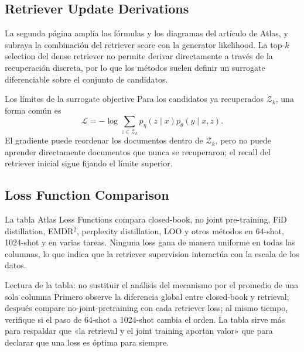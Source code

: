 \subsection{Retriever Update Derivations}

La segunda página amplía las fórmulas y los diagramas del artículo de Atlas, y subraya la combinación del retriever score con la generator likelihood. La top-$k$ selection del dense retriever no permite derivar directamente a través de la recuperación discreta, por lo que los métodos suelen definir un surrogate diferenciable sobre el conjunto de candidatos.


\begin{importantbox}{Los límites de la surrogate objective}
Para los candidatos ya recuperados $\mathcal{Z}_k$, una forma común es
\[
\mathcal{L}=-\log\sum_{z\in\mathcal{Z}_k}
p_\eta(z\mid x)p_\theta(y\mid x,z).
\]
El gradiente puede reordenar los documentos dentro de $\mathcal{Z}_k$, pero no puede aprender directamente documentos que nunca se recuperaron; el recall del retriever inicial sigue fijando el límite superior.
\end{importantbox}

\subsection{Loss Function Comparison}

La tabla Atlas Loss Functions compara closed-book, no joint pre-training, FiD distillation, EMDR$^2$, perplexity distillation, LOO y otros métodos en 64-shot, 1024-shot y en varias tareas. Ninguna loss gana de manera uniforme en todas las columnas, lo que indica que la retriever supervision interactúa con la escala de los datos.


\begin{knowledgebox}{Lectura de la tabla: no sustituir el análisis del mecanismo por el promedio de una sola columna}
Primero observe la diferencia global entre closed-book y retrieval; después compare no-joint-pretraining con cada retriever loss; al mismo tiempo, verifique si el paso de 64-shot a 1024-shot cambia el orden. La tabla sirve más para respaldar que «la retrieval y el joint training aportan valor» que para declarar que una loss es óptima para siempre.
\end{knowledgebox}

